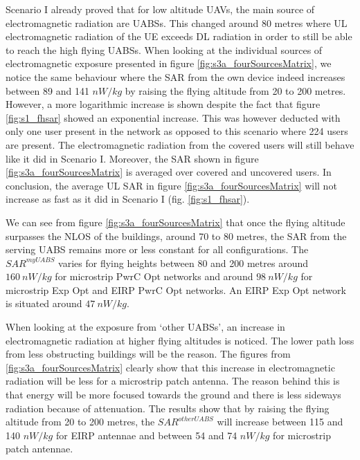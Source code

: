 Scenario I already proved that for low altitude \gls{UAV}s, the main source of electromagnetic radiation are \gls{UABS}s. 
This changed around 80 metres where \gls{UL} electromagnetic radiation of the \gls{UE}
exceeds \gls{DL} radiation in order to still be able to reach the high flying \gls{UABS}s. 
When looking at the individual sources of electromagnetic exposure presented in figure \ref{fig:s3a_fourSourcesMatrix}, 
we notice the same behaviour where the 
 \gls{SAR} from the own device indeed increases between 89 and 141 $nW/kg$ by raising the flying altitude from 
 20 to 200 metres.
 However, a more logarithmic increase is shown
despite the fact that figure \ref{fig:s1_fhsar} showed an exponential increase.
This was however deducted with only one user present in the network as opposed to this scenario 
where 224 users are present. 
The electromagnetic radiation from the covered users will still behave like it did in Scenario I.
Moreover, the \gls{SAR} shown in figure  \ref{fig:s3a_fourSourcesMatrix} is averaged  over covered and uncovered users.
In conclusion, the average  \gls{UL} \gls{SAR} in  figure \ref{fig:s3a_fourSourcesMatrix} will not increase as fast as it did
in Scenario I (fig. \ref{fig:s1_fhsar}).

We can see from figure \ref{fig:s3a_fourSourcesMatrix} that once the flying altitude surpasses the \gls{NLOS} of the buildings, 
around 70 to 80 metres, the SAR from the serving \gls{UABS} remains 
more or less constant for all configurations.
The $SAR^{myUABS}$ varies for flying heights between 80 and 200 metres
around $160\ nW/kg$ for microstrip \gls{PwrC Opt} networks and around $98\ nW/kg$ for microstrip \gls{Exp Opt} and \gls{EIRP} \gls{PwrC Opt} networks.
An \gls{EIRP} \gls{Exp Opt} network is situated around $47\ nW/kg$.

When looking at the exposure from `other \gls{UABS}s', an increase in electromagnetic radiation at higher 
flying altitudes is noticed.
The lower path loss from less obstructing buildings will be the reason.
The figures from \ref{fig:s3a_fourSourcesMatrix} clearly show that this increase 
in electromagnetic radiation will be less for a microstrip patch antenna. The reason behind this is that energy 
will be more focused towards the ground and there is less sideways radiation because of attenuation.
The results show that by raising the flying altitude from 20 to 200 metres,
the $SAR^{otherUABS}$ will increase between 115 and 140 $nW/kg$ for \gls{EIRP} antennae and between 54 and 74 $nW/kg$ for microstrip patch antennae.

